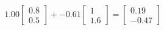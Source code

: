 \documentclass[preview]{standalone}
\begin{document}
\begin{align*}
1.00 \begin{bmatrix} 0.8 \\ 0.5 \end{bmatrix} + -0.61 \begin{bmatrix} 1 \\ 1.6 \end{bmatrix} = \begin{bmatrix} 0.19 \\ -0.47 \end{bmatrix}
\end{align*}
\end{document}
